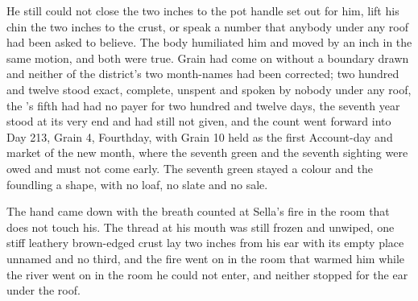 He still could not close the two inches to the pot handle set out for him, lift his chin the two inches to the crust, or speak a number that anybody under any roof had been asked to believe. The body humiliated him and moved by an inch in the same motion, and both were true. Grain had come on without a boundary drawn and neither of the district's two month-names had been corrected; two hundred and twelve stood exact, complete, unspent and spoken by nobody under any roof, the 's fifth had had no payer for two hundred and twelve days, the seventh year stood at its very end and had still not given, and the count went forward into Day 213, Grain 4, Fourthday, with Grain 10 held as the first Account-day and market of the new month, where the seventh green and the seventh sighting were owed and must not come early. The seventh green stayed a colour and the foundling a shape, with no loaf, no slate and no sale.

The hand came down with the breath counted at Sella's fire in the room that does not touch his. The thread at his mouth was still frozen and unwiped, one stiff leathery brown-edged crust lay two inches from his ear with its empty place unnamed and no third, and the fire went on in the room that warmed him while the river went on in the room he could not enter, and neither stopped for the ear under the roof.
